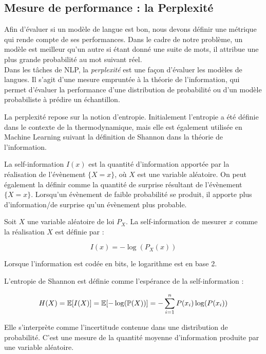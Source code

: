 \subsection{Mesure de performance : la Perplexité}

Afin d’évaluer si un modèle de langue est bon,
nous devons définir une métrique qui rende compte de ses performances.
Dans le cadre de notre problème, un modèle est meilleur qu’un autre si étant donné une
suite de mots, il attribue une plus grande probabilité au mot suivant réel.  \\

Dans les tâches de NLP, la \textit{perplexité} est une façon d’évaluer les modèles de langues.
Il s'agit d'une mesure empruntée à la théorie de l'information, qui permet d'évaluer la
performance d'une distribution de probabilité ou d'un modèle probabiliste à prédire un échantillon.


La perplexité repose sur la notion d’entropie.
Initialement l’entropie a été définie dans le contexte de la thermodynamique,
mais elle est également utilisée en Machine Learning suivant la
définition de Shannon dans la théorie de l’information.

La self-information $I(x)$ est la quantité d’information apportée par la réalisation de
l’évènement $\{X=x\}$, où $X$ est une variable aléatoire. On peut également la définir
comme la quantité de \og surprise \fg{} résultant de l’évènement $\{X=x\}$. Lorsqu’un évènement de
faible probabilité se produit, il apporte plus d’information/de surprise
qu’un évènement plus probable.

\begin{definition}

  Soit $X$ une variable aléatoire de loi $P_X$. La self-information de mesurer $x$
  comme la réalisation $X$ est définie par :

  \[ I(x) = - \log\left(P_X(x)\right) \]

\end{definition}

Lorsque l'information est codée en bits, le logarithme est en base 2.

\begin{definition}
L'entropie de Shannon est définie comme l'espérance de la self-information :

  \[ H(X) = \mathbb{E}[I(X)] = \mathbb{E}[-\log(\mathbb{P}(X))] = - \sum_{i=1}^{n} P(x_i)\log(P(x_i)) \]
\end{definition}

Elle s'interprète comme l'incertitude contenue dans une distribution de probabilité.
C'est une mesure de la quantité moyenne d'information produite par une
variable aléatoire.

